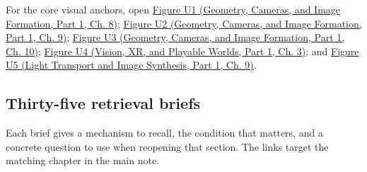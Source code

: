 For the core visual anchors, open \href{../03-Geometry-Cameras-and-Image-Formation-P01/main.pdf\#03-visual-computing-i-ch001-figure-u1---linear-maps-separate-directions-stretches-and-output-placement}{Figure U1 (Geometry, Cameras, and Image Formation, Part 1, Ch. 8)}; \href{../03-Geometry-Cameras-and-Image-Formation-P01/main.pdf\#03-visual-computing-i-ch002-figure-u2---a-half-edge-separates-face-traversal-from-edge-traversal}{Figure U2 (Geometry, Cameras, and Image Formation, Part 1, Ch. 9)}; \href{../03-Geometry-Cameras-and-Image-Formation-P01/main.pdf\#03-visual-computing-i-ch003-figure-u3---two-signals-can-share-the-same-samples}{Figure U3 (Geometry, Cameras, and Image Formation, Part 1, Ch. 10)}; \href{../07-Vision-XR-and-Playable-Worlds-P01/main.pdf\#04-visual-computing-ii-ch032-figure-u4---lighting-rank-determines-which-normal-components-can-be-measured}{Figure U4 (Vision, XR, and Playable Worlds, Part 1, Ch. 3)}; and \href{../04-Light-Transport-and-Image-Synthesis-P01/main.pdf\#04-visual-computing-ii-ch035-figure-u5---a-direct-light-renderer-makes-the-pipeline-executable}{Figure U5 (Light Transport and Image Synthesis, Part 1, Ch. 9)}.

\subsection{Thirty-five retrieval briefs}\label{appendix-a8f634b076b5-thirty-five-retrieval-briefs}

\hypertarget{appendix-a8f634b076b5-thirty-five-retrieval-briefs}{}

Each brief gives a mechanism to recall, the condition that matters, and a concrete question to use when reopening that section. The links target the matching chapter in the main note.

